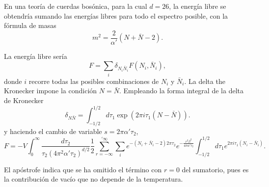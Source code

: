 

En una teoría de cuerdas bosónica, para la cual $d=26$, la energía libre se obtendría sumando las
energías libres para todo el espectro posible, con la fórmula de masas
\begin{equation}
  m^2=\frac{2}{\alpha'}(N+\bar N-2).
\end{equation}

La energía libre sería
\begin{equation}
  F=\sum_i \delta_{N_i \bar N_i} F(N_i,\bar N_i),
\end{equation}
donde $i$ recorre todas las posibles combinaciones de $N_i$ y $\bar N_i$.
La delta the Kronecker impone la condición $N=\bar N$. 
Empleando la forma integral de la delta de Kronecker
\begin{equation}
   \delta_{N\bar N}=\int_{-1/2}^{1/2}d\tau_1 \exp(2\pi i\tau_1 (N-\bar N)).
\end{equation}
y haciendo el cambio de variable $s=2\pi\alpha'\tau_2$,
\begin{equation}
  F=-V \int_0^\infty \frac{d\tau_2}{\tau_2(4\pi^2\alpha'\tau_2)^{d/2}}\frac 1 2\sum_{r=-\infty}^{'\infty} 
  \sum_i e^{-(N_i+\bar N_i -2)2\pi\tau_2} e^{-\frac{r^2\beta^2}{4\pi\alpha'\tau_2}}\int_{-1/2}^{1/2} d\tau_1 e^{2\pi i\tau_1(N_i-\bar N_i)}.
\end{equation}

El apóstrofe indica que se ha omitido el término con $r=0$ del sumatorio, pues es la contribución
de vacío que no depende de la temperatura.

